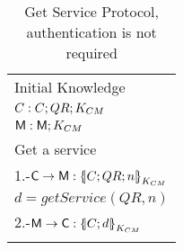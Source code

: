 \begin{table}[htb]
\footnotesize
\begin{center}
\caption{Get Service Protocol, authentication is not required}
\label{table:ProtGetServicesNoAuth}
\begin{tabular}{|l|}
\hline
           Initial Knowledge                                                             \\
            $C:C; QR ;  K_{CM}$                                    \\
            $\textsf{M}: \textsf{M}; K_{CM}$    \\ \hline \hline 
           Get a service                                                                        \\
           1.-$\Client\rightarrow \Server: \fat{C \lnk QR \lnk n}_{K_{\client\serverW}}$          \\ 
           \hspace{5mm} $d=getService(QR,n)$                                  \\  
           2.-$\Server\rightarrow \Client: \fat{C \lnk d}_{K_{\client\serverW}}$       \\ \\ \hline \hline
\end{tabular}
\end{center}
\end{table}
\normalsize
